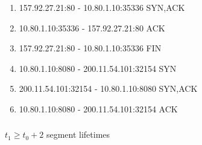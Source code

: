 \subsubsection{}
\begin{enumerate}
\item 157.92.27.21:80 - 10.80.1.10:35336 	SYN,ACK
\item 10.80.1.10:35336 - 157.92.27.21:80 	ACK
\item 157.92.27.21:80 - 10.80.1.10:35336 	FIN
\item 10.80.1.10:8080 - 200.11.54.101:32154 SYN
\item 200.11.54.101:32154 - 10.80.1.10:8080 SYN,ACK
\item 10.80.1.10:8080 - 200.11.54.101:32154 ACK
\end{enumerate}

\subsubsection{}
$t_1 \geq t_0 + 2 $ segment lifetimes
